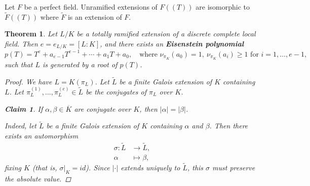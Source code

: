 \documentclass{article}
\newcommand{\term}{\textbf}
\newcommand{\examplesymbol}{$\blacktriangle$}
\renewcommand{\qedsymbol}{$\blacksquare$}
\theoremstyle{myplain}
\newtheorem{theorem}[proposition]{Theorem}
\newtheorem*{claim}{Claim}
\theoremstyle{mydefinition}
\newenvironment{example}
  {\pushQED{\qed}\renewcommand{\qedsymbol}{\examplesymbol}\examplex}
  {\popQED\endexamplex}
\begin{document}
\begin{example}
  Let $F$ be a perfect field. Unramified extensions of $F (\!(T)\!)$ are
  isomorphic to $\widetilde{F} (\!(T)\!)$ where $\widetilde{F}$ is an extension
  of $F$.
\end{example}

\begin{theorem}
  Let $L/K$ be a totally ramified extension of a discrete complete local
  field. Then $e = e_{L/K} = [L:K]$, and there exists an
  \term{Eisenstein polynomial}
  $$p (T) = T^e + a_{e-1} T^{e-1} + \cdots + a_1 T + a_0, \quad
  \text{where }\nu_{\pi_K} (a_0) = 1, ~ \nu_{\pi_K} (a_i) \ge 1 \text{ for } i = 1, \ldots, e-1,$$
  such that $L$ is generated by a root of $p (T)$.

  \begin{proof}[Proof]
    We have $L = K (\pi_L)$. Let $\widetilde{L}$ be a finite Galois extension of
    $K$ containing $L$. Let $\pi_L^{(1)}, \ldots, \pi_L^{(e)} \in \widetilde{L}$
    be the conjugates of $\pi_L$ over $K$.

    \begin{claim}
      If $\alpha, \beta \in \overline{K}$ are conjugate over $K$, then
      $|\alpha| = |\beta|$.
    \end{claim}

    Indeed, let $\widetilde{L}$ be a finite Galois extension of $K$ containing
    $\alpha$ and $\beta$. Then there exists an automorphism
    \begin{align*}
      \sigma\colon \widetilde{L} & \to \widetilde{L},\\
      \alpha & \mapsto \beta,
    \end{align*}
    fixing $K$ (that is, $\left.\sigma\right|_K = id$). Since $|\cdot|$ extends
    uniquely to $\widetilde{L}$, this $\sigma$ must preserve the absolute value.

    \vspace{1em}


\end{proof}
\end{theorem}
\end{document}
